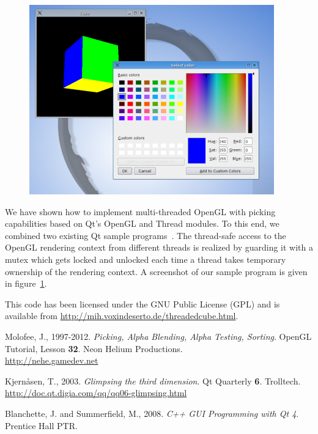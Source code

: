 \documentclass[jou,noapacite]{apa}
\begin{document}
\begin{figure}[bp]
\begin{center}
  \includegraphics[width=.95\linewidth  %
  ]
  {threadedcube_screenshot.png}
  \label{fig:screenshot}
\end{center}
\end{figure}

We have shown how to implement multi-threaded OpenGL with picking capabilities
based on Qt's OpenGL and Thread modules.
%
To this end, we combined two existing Qt sample
programs~\cite{glimpse3d,Blanchette2008}.
%
The thread-safe access to the OpenGL rendering context from different threads
is realized by guarding it with a mutex which gets locked and unlocked each
time a thread takes temporary ownership of the rendering context.
%
A screenshot of our sample program is given in figure~\ref{fig:screenshot}.
%


This code has been licensed under the GNU Public License (GPL) and is available
from \url{http://mih.voxindeserto.de/threadedcube.html}.





\begin{thebibliography}{10}


  Molofee, J., 1997-2012. {\itshape Picking, Alpha Blending, Alpha Testing, Sorting}. OpenGL Tutorial, Lesson {\bf 32}. Neon Helium Productions. \\\url{http://nehe.gamedev.net}

Kjern\r{a}sen, T., 2003. {\itshape Glimpsing the third dimension}. Qt Quarterly {\bf 6}. Trolltech.
\url{http://doc.qt.digia.com/qq/qq06-glimpsing.html}

Blanchette, J. and Summerfield, M., 2008. {\itshape C++ GUI Programming with Qt
  4}.   Prentice Hall PTR.
\end{thebibliography}
\end{document}
